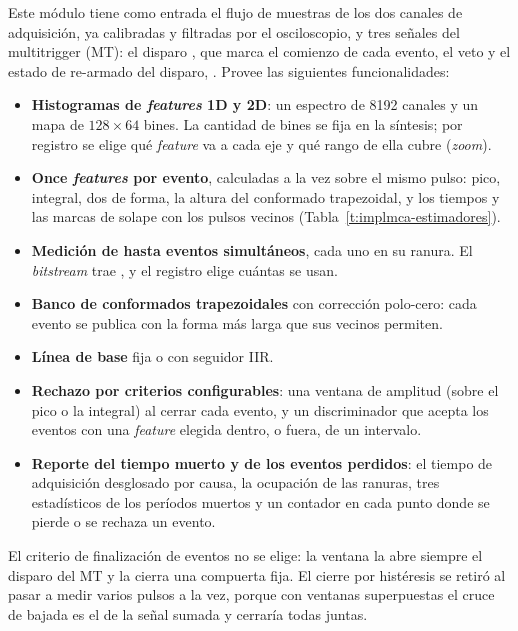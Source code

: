 Este módulo tiene como entrada el flujo de muestras de los dos canales de
adquisición, ya calibradas y filtradas por el osciloscopio, y tres señales del
multitrigger (MT): el disparo , que marca el comienzo de cada
evento, el veto  y el estado de re-armado del disparo,
. Provee las siguientes funcionalidades:
\begin{itemize}
  \item \textbf{Histogramas de \emph{features} 1D y 2D}: un espectro de 8192 canales y
    un mapa de $128 \times 64$ bines. La cantidad de bines se fija en la
    síntesis; por registro se elige qué \emph{feature} va a cada eje y qué rango de
    ella cubre (\emph{zoom}).
  \item \textbf{Once \emph{features} por evento}, calculadas a la vez sobre el mismo
    pulso: pico, integral, dos de forma, la altura del conformado trapezoidal,
    y los tiempos y las marcas de solape con los pulsos vecinos
    (Tabla~\ref{t:implmca-estimadores}).
  \item \textbf{Medición de hasta  eventos simultáneos}, cada uno
    en su ranura. El \emph{bitstream} trae , y el registro
     elige cuántas se usan.
  \item \textbf{Banco de conformados trapezoidales} con corrección polo-cero:
    cada evento se publica con la forma más larga que sus vecinos permiten.
  \item \textbf{Línea de base} fija o con seguidor IIR.
  \item \textbf{Rechazo por criterios configurables}: una ventana de amplitud
    (sobre el pico o la integral) al cerrar cada evento, y un discriminador que
    acepta los eventos con una \emph{feature} elegida dentro, o fuera, de un
    intervalo.
  \item \textbf{Reporte del tiempo muerto y de los eventos perdidos}: el tiempo
    de adquisición desglosado por causa, la ocupación de las ranuras, tres
    estadísticos de los períodos muertos y un contador en cada punto donde se
    pierde o se rechaza un evento.
\end{itemize}

El criterio de finalización de eventos no se elige: la ventana la abre siempre
el disparo del MT y la cierra una compuerta fija. El cierre por histéresis se
retiró al pasar a medir varios pulsos a la vez, porque con ventanas superpuestas el
cruce de bajada es el de la señal sumada y cerraría todas juntas.

